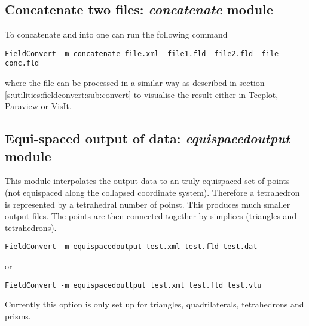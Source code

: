 \subsection{Concatenate two files: \textit{concatenate} module}
To concatenate  and  into 
one can run the following command
%
\begin{lstlisting}[style=BashInputStyle]
FieldConvert -m concatenate file.xml  file1.fld  file2.fld  file-conc.fld
\end{lstlisting}
%
where the file  can be processed in a similar 
way as described in section \ref{s:utilities:fieldconvert:sub:convert}
to visualise the result either in Tecplot, Paraview or VisIt.
%
%
%
\subsection{Equi-spaced output of data: \textit{equispacedoutput} module}
This module interpolates the output data to an truly equispaced set of
points (not equispaced along the collapsed coordinate
system). Therefore a tetrahedron is represented by a tetrahedral
number of poinst. This produces much smaller output files. The points
are then connected together by simplices (triangles and tetrahedrons).

\begin{lstlisting}[style=BashInputStyle]
FieldConvert -m equispacedoutput test.xml test.fld test.dat
\end{lstlisting}

or

\begin{lstlisting}[style=BashInputStyle]
FieldConvert -m equispacedouttput test.xml test.fld test.vtu
\end{lstlisting}


\begin{notebox} 
Currently this option is only set up for triangles, quadrilaterals,
tetrahedrons and prisms.
\end{notebox}

